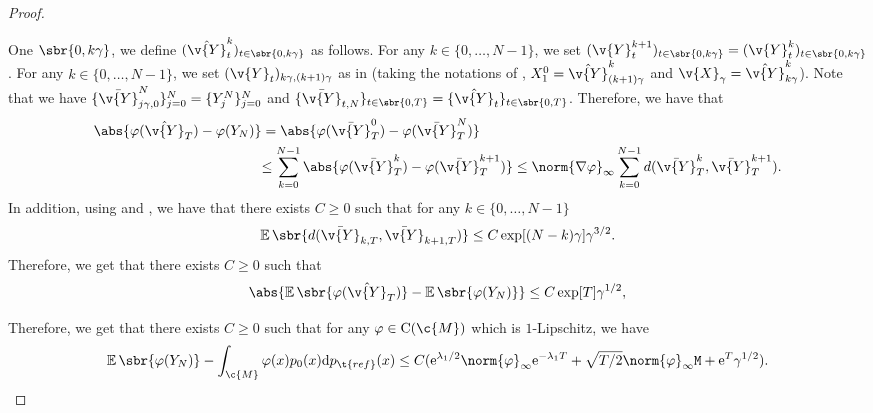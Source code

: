 \begin{proof}
\begin{enumerate}[wide, labelindent=0pt, label=(\alph*)]
		      One \(\sbr{0, k\gamma}\), we define \((\hat{\v{Y}}_t^k)_{t \in \sbr{0, k\gamma}}\) as follows.
		      For any \(k \in \{0, \dots, N-1\}\), we set \((\v{Y}_t^{k+1})_{t \in \sbr{0, k\gamma}} = (\v{Y}_t^k)_{t \in \sbr{0, k\gamma}}\).
		      For any \(k \in \{0, \dots, N-1\}\), we set \((\v{Y}_t)_{k\gamma, (k+1)\gamma}\) as in  (taking the notations of , \(X_1^0 = \hat{\v{Y}}_{(k+1)\gamma}^k\) and \(\v{X}_\gamma = \hat{\v{Y}}_{k \gamma}^k\)).
		      Note that we have \(\{\bar{\v{Y}}_{j\gamma,0}^N\}_{j=0}^N = \{Y_j^N\}_{j=0}^N\) and \(\{\bar{\v{Y}}_{t, N}\}_{t \in \sbr{0,T}} = \{\hat{\v{Y}}_t\}_{t \in \sbr{0,T}}\).
		      Therefore, we have that \begin{align} { \abs{\varphi(\hat{\v{Y}}_T) - \varphi(Y_N)}} & =\abs{\varphi(\bar{\v{Y}}_{T}^0) - \varphi(\bar{\v{Y}}_{T}^N)} \\ &{\leq \sum_{k=0}^{N-1} \abs{\varphi(\bar{\v{Y}}_{T}^k) - \varphi(\bar{\v{Y}}_{T}^{k+1})} \leq \norm{\nabla \varphi}_\infty \sum_{k=0}^{N-1} d(\bar{\v{Y}}_{T}^k, \bar{\v{Y}}_{T}^{k+1}) } .
		      \end{align}
		      In addition, using  and , we have that there exists \(C \geq 0\) such that for any \(k \in \{0, \dots, N-1\}\) \begin{equation} \E\sbr{d(\bar{\v{Y}}_{k,T}, \bar{\v{Y}}_{k+1, T})} \leq C \exp[(N-k) \gamma] \gamma^{3/2} .
		      \end{equation}
		      Therefore, we get that there exists \(C \geq 0\) such that \begin{equation} \abs{\E\sbr{\varphi(\hat{\v{Y}}_T)} - \E\sbr{\varphi(Y_N)}} \leq C \exp[T] \gamma^{1/2} , \end{equation} \end{enumerate} 

	Therefore, we get that there exists \(C \geq 0\) such that for any \(\varphi \in \mathrm{C}(\c{M})\) which is \(1\)-Lipschitz, we have \begin{equation} \label{eq:inter} { \E\sbr{\varphi(Y_N)} - \int_{\c{M}} \varphi(x) p_{0}(x) \mathrm{d} p_{\t{ref}}(x) \leq C (\mathrm{e}^{\lambda_1/2}\norm{\varphi}_\infty \mathrm{e}^{-\lambda_1 T} + \sqrt{T/2} \norm{\varphi}_\infty \mathtt{M} + \mathrm{e}^T \gamma^{1/2}) .
		}
	\end{equation}


\end{proof}
